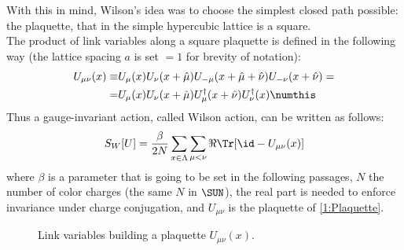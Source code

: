 With this in mind, Wilson's idea was to choose the simplest closed path possible: the plaquette, that in the simple hypercubic lattice is a square.\\
The product of link variables along a square plaquette is defined in the following way (the lattice spacing $a$ is set $=1$ for brevity of notation):
\begin{align*}
    U_{\mu\nu}(x) \equiv& U_\mu(x)U_\nu(x+\hat\mu)U_{-\mu}(x+\hat\mu+\hat\nu)U_{-\nu}(x+\hat\nu) =\\
    =& U_\mu(x)U_\nu(x+\hat\mu)U^\dagger_\mu(x+\hat\nu)U^\dagger_\nu(x) \numthis\label{1:Plaquette}
\end{align*}
Thus a gauge-invariant action, called Wilson action, can be written as follows:
\begin{equation}
    S_W[U]=\frac\beta{2N}\sum_{x\in\Lambda}\sum_{\mu<\nu}\Re\Tr[\id-U_{\mu\nu}(x)] \label{1:WilsonAction}
\end{equation}
where $\beta$ is a parameter that is going to be set in the following passages, $N$ the number of color charges (the same $N$ in $\SUN$), the real part is needed to enforce invariance under charge conjugation, and $U_{\mu\nu}$ is the plaquette of \eqref{1:Plaquette}.
\begin{figure}[!htbp]
    \centering
    \caption{Link variables building a plaquette $U_{\mu\nu}(x)$.}
    \label{1F:Plaquette}
\end{figure}


